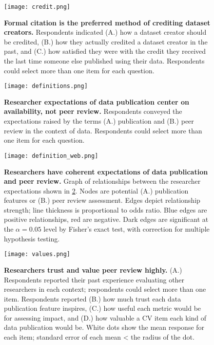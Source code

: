 \documentclass[10pt]{article}
\begin{document}
\begin{figure}[!ht]
\begin{center}
\texttt{[image: credit.png]}
\end{center}
\caption{
{\bf Formal citation is the preferred method of crediting dataset creators.}
Respondents indicated (A.) how a dataset creator should be credited, (B.) how they actually credited a dataset creator in the past, and (C.) how satisfied they were with the credit they received the last time someone else published using their data.  Respondents could select more than one item for each question.
} 
\label{fig:credit}
\end{figure}


\begin{figure}[!ht]
\begin{center}
\texttt{[image: definitions.png]}
\end{center}
\caption{
{\bf Researcher expectations of data publication center on availability, not peer review.}
Respondents conveyed the expectations raised by the terms (A.) publication and (B.) peer review in the context of data. Respondents could select more than one item for each question.
}
\label{fig:definitions}
\end{figure}


\begin{figure}[!ht]
\begin{center}
\texttt{[image: definition\_web.png]}
\end{center}
\caption{
{\bf Researchers have coherent expectations of data publication and peer review.}
Graph of relationships between the researcher expectations shown in \ref{fig:definitions}. 
Nodes are potential (A.) publication features or (B.) peer review assessment.
Edges depict relationship strength; line thickness is proportional to odds ratio. Blue edges are positive relationships, red are negative. Dark edges are significant at the $\alpha=0.05$ level by Fisher's exact test, with correction for multiple hypothesis testing.
}
\label{fig:definition_web}
\end{figure}


\begin{figure}[!ht]
\begin{center}
\texttt{[image: values.png]}
\end{center}
\caption{
{\bf Researchers trust and value peer review highly.}
(A.) Respondents reported their past experience evaluating other researchers in each context; respondents could select more than one item.
Respondents reported (B.) how much trust each data publication feature inspires, (C.) how useful each metric would be for assessing impact, and (D.) how valuable a CV item each kind of data publication would be.
White dots show the mean response for each item; standard error of each mean < the radius of the dot.
}

\label{fig:values}
\end{figure}
\end{document}
